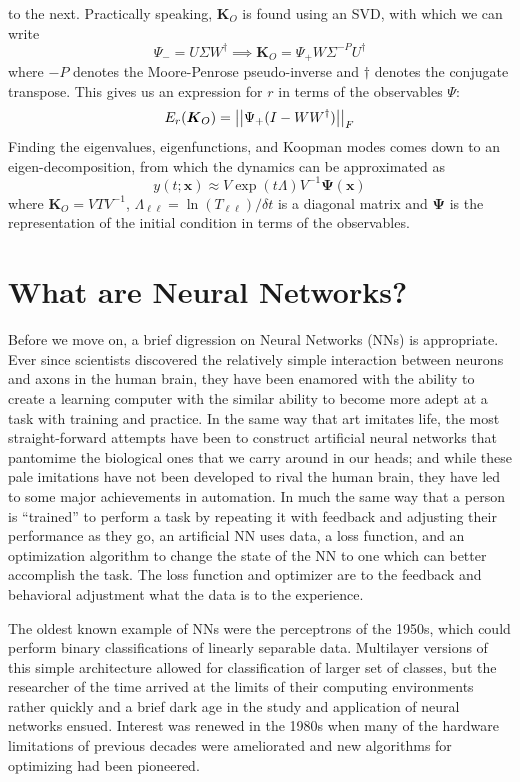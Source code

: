 to the next. Practically speaking, $\boldsymbol{K}_O$ is found
using an SVD, with which we can write
$$\Psi_- = U\Sigma W^{\dagger} \implies \boldsymbol{K}_O = \Psi_+W\Sigma^{-P}
U^{\dagger}$$
where $-P$ denotes the Moore-Penrose pseudo-inverse and $\dagger$ denotes the 
conjugate transpose. This gives us an expression for $r$ in terms of the 
observables $\Psi$:
$$E_r(\boldsymbol{K}_O) = \left|\left|\Psi_+(I - WW^\dagger)\right|\right|_F$$
Finding the eigenvalues, eigenfunctions, and Koopman modes comes down to an 
eigen-decomposition, from which the dynamics can be approximated as 
$$y(t;\boldsymbol{x}) \approx V\exp(t\Lambda)V^{-1}\boldsymbol{\Psi}
(\boldsymbol{x})$$
where $\boldsymbol{K}_O = VTV^{-1}$, $\Lambda_{\ell\ell} = \ln(T_{\ell\ell})/
\delta t$ is a diagonal matrix and $\boldsymbol{\Psi}$ is the representation 
of the initial condition in terms of the observables. 

\section{What are Neural Networks?}

Before we move on, a brief digression on Neural Networks (NNs) is appropriate. Ever since
scientists discovered the relatively simple interaction between neurons and axons in 
the human brain, they have been enamored with the ability to create a learning computer 
with the similar ability to become more adept at a task with training and practice. 
In the same way that art imitates life, the most straight-forward attempts have been 
to construct artificial neural networks that pantomime the biological ones that we carry 
around in our heads; and while these pale imitations have not been developed to rival the 
human brain, they have led to some major achievements in automation. In much the same 
way that a person is ``trained'' to perform a task by repeating it with feedback and 
adjusting their performance as they go, an artificial NN uses data, a loss function, and 
an optimization algorithm to change the state of the NN to one which can better accomplish 
the task. The loss function and optimizer are to the feedback and behavioral adjustment 
what the data is to the experience. 

The oldest known example 
of NNs were the perceptrons of the 1950s, which could perform binary classifications of 
linearly separable data. Multilayer versions of this simple architecture allowed for 
classification of larger set of classes, but the researcher of the time arrived at the 
limits of their computing environments rather quickly and a brief dark age in the study 
and application of neural networks ensued. Interest was renewed in the 1980s when many 
of the hardware limitations of previous decades were ameliorated and new algorithms for 
optimizing had been pioneered.

